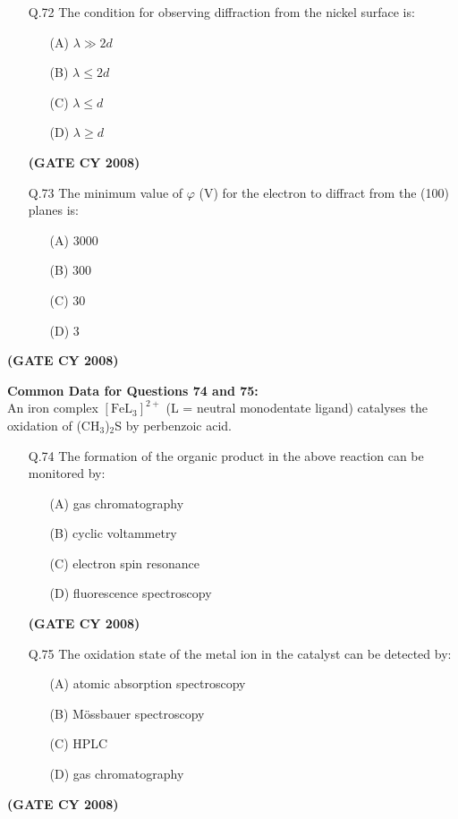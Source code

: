 \documentclass[12pt]{article}
\begin{document}
\begin{enumerate}
\begin{itemize}
    \item[Q.72] The condition for observing diffraction from the nickel surface is:
    \begin{enumerate}
        \item[(A)] $\lambda \gg 2d$
        \item[(B)] $\lambda \leq 2d$
        \item[(C)] $\lambda \leq d$
        \item[(D)] $\lambda \geq d$
    \end{enumerate}   \textbf{(GATE CY 2008)}


    \item[Q.73] The minimum value of $\varphi$ (V) for the electron to diffract from the (100) planes is:
    \begin{enumerate}
        \item[(A)] 3000
        \item[(B)] 300
        \item[(C)] 30
        \item[(D)] 3
    \end{enumerate}
\end{itemize}   \textbf{(GATE CY 2008)}


\textbf{Common Data for Questions 74 and 75:} \\
An iron complex $[\text{FeL}_3]^{2+}$ (L = neutral monodentate ligand) catalyses the oxidation of (CH$_3$)$_2$S by perbenzoic acid.

\begin{itemize}
    \item[Q.74] The formation of the organic product in the above reaction can be monitored by:
    \begin{enumerate}
        \item[(A)] gas chromatography
        \item[(B)] cyclic voltammetry
        \item[(C)] electron spin resonance
        \item[(D)] fluorescence spectroscopy
    \end{enumerate}   \textbf{(GATE CY 2008)}


    \item[Q.75] The oxidation state of the metal ion in the catalyst can be detected by:
    \begin{enumerate}
        \item[(A)] atomic absorption spectroscopy
        \item[(B)] M\"ossbauer spectroscopy
        \item[(C)] HPLC
        \item[(D)] gas chromatography
    \end{enumerate}
\end{itemize}   \textbf{(GATE CY 2008)}



\end{enumerate}
\end{document}
